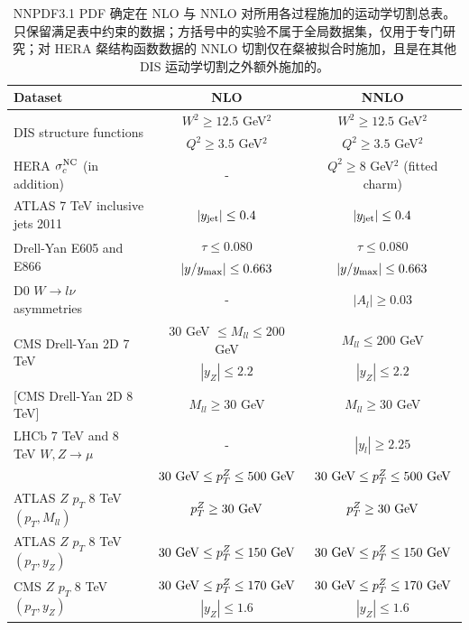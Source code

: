 \begin{table}[t]
  \begin{center}
    \footnotesize
    \renewcommand{\arraystretch}{1.7}
    \begin{tabular}{|l|c|c|}
\hline
Dataset & NLO & NNLO \\
\hline
\hline
\multirow{2}{*}{DIS structure functions}  & $W^2\ge 12.5$ GeV$^2$ & $W^2\ge 12.5$ GeV$^2$ \\
& $Q^2\ge 3.5$ GeV$^2$ & $Q^2\ge 3.5$ GeV$^2$ \\
\hline
HERA $\sigma_c^{\rm NC}$ (in addition)  &  - &   $Q^2 \ge 8$ GeV$^2$ (fitted charm) \\
\hline
\hline
ATLAS 7 TeV inclusive jets 2011  & $|y_{\rm jet}|\le 0.4 $ &
$|y_{\rm jet}|\le 0.4 $ \\
\hline
\hline
\multirow{2}{*}{Drell-Yan E605 and E866}  & $\tau \le 0.080$ &  $\tau \le 0.080$ \\
& $|y/y_{\rm max}|\le 0.663$ &  $|y/y_{\rm max}|\le 0.663$  \\
\hline
D0 $W \to l\nu$ asymmetries  & - & $|A_{l}|\ge 0.03 $ \\
\hline
\multirow{2}{*}{CMS Drell-Yan 2D 7 TeV}
& 30 GeV $\le M_{ll}\le 200$ GeV &  $ M_{ll}\le 200$ GeV   \\
&  $|y_Z|\le 2.2$  &  $|y_Z|\le 2.2$  \\
\hline
\multirow{1}{*}{[CMS Drell-Yan 2D  8 TeV]}   &  $ M_{ll}\ge 30$ GeV &  $ M_{ll}\ge 30$ GeV   \\
\hline
LHCb 7 TeV and 8 TeV $W,Z\to \mu$  & - & $|y_{l}|\ge 2.25 $ \\
\hline
\hline
[ATLAS $Z$ $p_T$ 7 TeV]   & $30~{\rm GeV}\le p_T^Z \le 500~{\rm GeV}$ &
$30~{\rm GeV}\le p_T^Z \le 500~{\rm GeV}$ \\
\hline
ATLAS $Z$ $p_T$ 8 TeV $(p_T,M_{ll})$    & $ p_T^Z\ge30~{\rm GeV}$ &
$ p_T^Z\ge30~{\rm GeV}$ \\
\hline
ATLAS $Z$ $p_T$ 8 TeV $(p_T,y_{Z})$    & $30~{\rm GeV}\le p_T^Z \le 150~{\rm GeV}$ &
$30~{\rm GeV}\le p_T^Z \le 150~{\rm GeV}$ \\
\hline
\multirow{2}{*}{CMS $Z$ $p_T$ 8 TeV $(p_T,y_{Z})$}   & $30~{\rm GeV}\le p_T^Z \le 170~{\rm GeV}$ &
$30~{\rm GeV}\le p_T^Z \le 170~{\rm GeV}$ \\
& $|y_Z| \le 1.6$ &   $|y_Z| \le 1.6$ \\
\hline
    \end{tabular}
\caption{\small NNPDF3.1 PDF 确定在 NLO 与 NNLO 对所用各过程施加的运动学切割总表。只保留满足表中约束的数据；方括号中的实验不属于全局数据集，仅用于专门研究；对 HERA 粲结构函数数据的 NNLO 切割仅在粲被拟合时施加，且是在其他 DIS 运动学切割之外额外施加的。
\label{eq:tablekincuts}}
\end{center}
\end{table}



